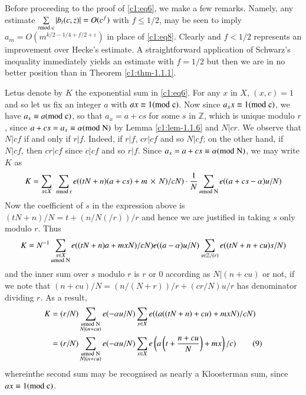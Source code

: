 Before proceeding to the proof of \eqref{c1:eq6}, we make a few
remarks. Namely, any estimate $\sum\limits_{t\rm{mod} \;
  c}|b_{t}(c,z)|=O(c^{f})$ with $f\leq 1/2$, may be seen to imply
$a_{m}=O(m^{k/2-1/4+f/2+\varepsilon})$ in place of \eqref{c1:eq8}. Clearly
and $f<1/2$ represents an improvement over Hecke's estimate. A
straightforward application of Schwarz's inequality immediately yields
an estimate with $f=1/2$ but then we are in no better position than in
Theorem \ref{c1:thm-1.1.1}.

Let\pageoriginale us denote by $K$ the exponential sum in
\eqref{c1:eq6}. For any $x$ in $X$, $(x,c)=1$ and so let us fix an
integer $a$ with $ax\equiv 1(\rm{mod} \; c)$. Now since $a_{x}x\equiv 1(\rm{mod} \;
c)$, we have $a_{x}\equiv a(\rm{mod} \; c)$, so that $a_{x}=a+cs$ for some
$s$ in $\mathbb{Z}$, which is unique modulo $r$, since
$a+cs=a_{x}\equiv \alpha(\rm{mod} \; N)$ by Lemma \ref{c1:lem-1.1.6} and
$N|cr$. We observe that $N|cf$ if and only if $r|f$. Indeed, if $r|f$,
$cr|cf$ and so $N|cf$; on the other hand, if $N|cf$, then $cr|cf$
since $c|cf$ and so $r|f$. Since $a_{x}=a+cs\equiv\alpha(\rm{mod} \; N)$, we
may write $K$ as
$$
K=\sum_{x\in X} \; \sum_{s\rm{mod}\; r} e((tN+n)(a+cs)+m \, \times \,
N)/cN)\cdot \frac{1}{N}\sum_{u\rm{mod} \; N}e((a+cs-\alpha)u/N) 
$$
Now the coefficient of $s$ in the expression above is
$(tN+n)/N=t+(n/N(/r))/r$ and hence we are justified in taking $s$ only
modulo $r$. Thus
{\fontsize{10}{12}\selectfont
$$
K=N^{-1}\sum_{\substack{x\in X\\ u\rm{mod} \;
    N}}e((tN+n)a+mxN)/cN)e((a-\alpha)u/N)\sum\limits_{s\in\mathbb{Z}/(r)}e((tN+n+cu)s/N) 
$$}\relax
and the inner sum over $s$ modulo $r$ is $r$ or $0$ according as
$N|(n+cu)$ or not, if we note that $(n+cu)/N=(n/(N+r))/r+(cr/N)u/r$
has denominator dividing $r$. As a result,
\begin{align*}
K &= (r/N)\sum_{\substack{u\rm{mod} \; N\\ N|(n+cu)}}e(-\alpha u/N)\sum_{x\in
  X}e((a((tN+n)+cu)+mxN)/cN)\\
&= (r/N)\sum_{\substack{u\rm{mod} \; N\\ N|(n+cu)}}e(-\alpha u/N)\sum_{x\in X}e\left(a\left(t+\frac{n+cu}{N}\right)+mx\right)/c)\tag{9}\label{c1:eq9}
\end{align*}
wherein\pageoriginale the second sum may be recognised as nearly a
Kloosterman sum, since $ax\equiv 1(\rm{mod} \; c)$.

